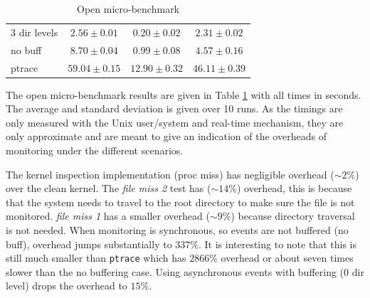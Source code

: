 \begin{table}
\begin{tabular}{ | l || c | c | c | }
3 dir levels & \begin{math} 2.56\pm0.01 \end{math} & \begin{math} 0.20\pm0.02 \end{math} & \begin{math} 2.31\pm0.02 \end{math} \\
no buff & \begin{math} 8.70\pm0.04 \end{math} & \begin{math} 0.99\pm0.08 \end{math} & \begin{math} 4.57\pm0.16 \end{math} \\
ptrace & \begin{math} 59.04\pm0.15 \end{math} & \begin{math} 12.90\pm0.32 \end{math} & \begin{math} 46.11\pm0.39 \end{math} \\
\hline
\end{tabular}
\caption{Open micro-benchmark}
\label{tab:lbox-open}
\end{table}

The open micro-benchmark results are given in Table \ref{tab:lbox-open}
with all times in seconds. The average and standard deviation
is given over 10 runs.
As the timings are only measured with the Unix user/system and real-time
mechanism, they are only approximate and are meant
to give an indication of the overheads of monitoring
under the different scenarios.

The kernel inspection implementation (proc miss) has negligible overhead
($\sim 2\%$) over the clean kernel.
The {\em file miss 2} test has ($\sim 14\%$) overhead, this is because that
the system needs to travel to the root directory to make sure the file is
not monitored.
{\em file miss 1} has a smaller overhead ($\sim 9\%$) because directory
traversal is not needed.
When monitoring is synchronous, so events are not buffered (no buff),
overhead jumps substantially to $337\%$.
It is interesting to note that this is still much smaller than {\tt ptrace}
which has $2866\%$ overhead or about seven times slower than the
no buffering case.
Using asynchronous events with buffering (0 dir level) 
drops the overhead to $15\%$.

